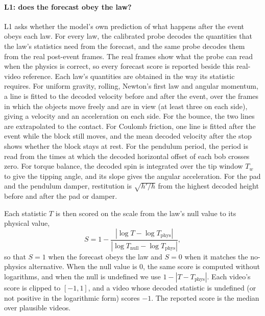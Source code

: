 \documentclass[10pt]{article}
\begin{document}
\paragraph{L1: does the forecast obey the law?}
L1 asks whether the model's own prediction of what happens after the event obeys each law. For every law, the
calibrated probe decodes the quantities that the law's statistics need from the forecast, and the same probe decodes
them from the real post-event frames. The real frames show what the probe can read when the physics is correct, so
every forecast score is reported beside this real-video reference. Each law's quantities are obtained in the way its
statistic requires. For uniform gravity, rolling, Newton's first law and angular momentum, a line is fitted to the
decoded velocity before and after the event, over the frames in which the objects move freely and are in view (at
least three on each side), giving a velocity and an acceleration on each side. For the bounce, the two lines are
extrapolated to the contact. For Coulomb friction, one line is fitted after the event while the block still moves, and
the mean decoded velocity after the stop shows whether the block stays at rest. For the pendulum period, the period
is read from the times at which the decoded horizontal offset of each bob crosses zero. For torque balance, the decoded
spin is integrated over the tip window $T_w$ to give the tipping angle, and its slope gives the angular acceleration. For the
pad and the pendulum damper, restitution is $\sqrt{h'/h}$ from the highest decoded height before and after the pad or damper.

Each statistic $T$ is then scored on the scale from the law's null value to its physical value,
\[
S=1-\frac{|\log T-\log T_{\mathrm{phys}}|}{|\log T_{\mathrm{null}}-\log T_{\mathrm{phys}}|},
\]
so that $S=1$ when the forecast obeys the law and $S=0$ when it matches the no-physics alternative. When the null
value is $0$, the same score is computed without logarithms, and when the null is undefined we use
$1-|T-T_{\mathrm{phys}}|$. Each video's score is clipped to $[-1,1]$, and a video whose decoded statistic is undefined
(or not positive in the logarithmic form) scores $-1$. The reported score is the median over plausible videos.
\end{document}
